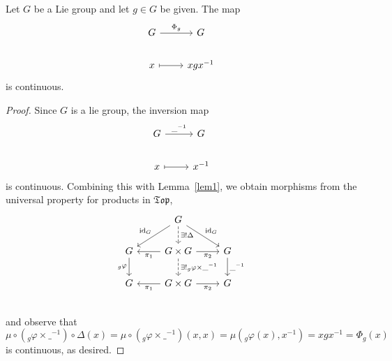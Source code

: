 \documentclass[10pt]{amsart}
\begin{document}
\begin{cor}\label{cor1}
  Let $G$ be a Lie group and let $g \in G$ be given.
  The map
  $$\begin{tikzcd}
    G \arrow{r}{\Phi_g} &G\\
    x \arrow[mapsto]{r}& xgx^{-1}
  \end{tikzcd}$$
  is continuous.

  \begin{proof}
    Since $G$ is a lie group, the inversion map
    $$\begin{tikzcd}
      G \arrow{r}{\_^{-1}} &G\\
      x \arrow[mapsto]{r} & x^{-1} 
    \end{tikzcd}$$
    is continuous.
    Combining this with Lemma~\ref{lem1}, we obtain morphisms from the universal property for products in $\mathfrak{Top}$,
    $$\begin{tikzcd}
      & G\arrow[swap]{ld}{\operatorname{id}_G}\arrow{rd}{\operatorname{id}_G}\arrow[dashed]{d}{\exists !\Delta}\\
      G\arrow[swap]{d}{_g\varphi} & \arrow{l}{\pi_1} G \times G \arrow[dashed]{d}{\exists !_g\varphi \times \_^{-1}} \arrow[swap]{r}{\pi_2} & G\arrow{d}{\_^{-1}}\\
      G & \arrow{l}{\pi_1} G \times G \arrow[swap]{r}{\pi_2} & G\\
    \end{tikzcd}$$
    and observe that 
    $$\mu \circ \left(_g\varphi \times \_^{-1}\right) \circ \Delta(x)
    = \mu \circ \left(_g\varphi \times \_^{-1}\right)(x,x)
    = \mu (_g\varphi(x),x^{-1})
    = xgx^{-1}
    = \Phi_g(x)$$
    is continuous, as desired.
  \end{proof}
\end{cor}
\end{document}
